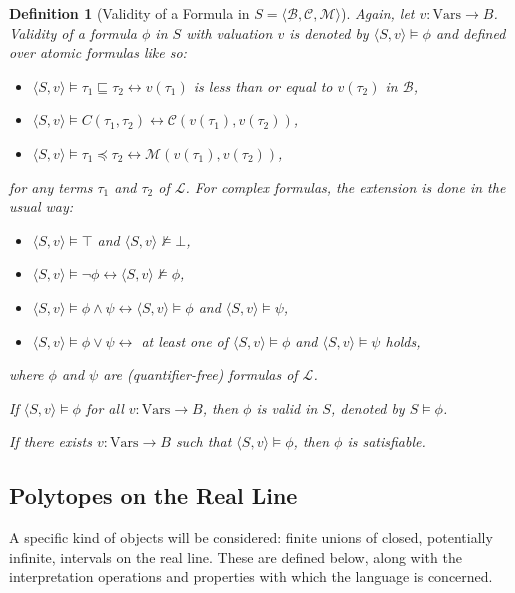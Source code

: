 \documentclass{article}
\newtheorem*{definition}{Definition}
\newcommand{\B}{\mathcal{B}}
\newcommand{\lang}{\mathcal{L}}
\newcommand{\Vars}{\text{Vars}}
\newcommand{\lpart}{\sqsubseteq}
\newcommand{\lcont}{C}
\newcommand{\lmeasure}{\preceq}
\begin{document}
\begin{definition}[Validity of a Formula in $S = \langle \B, \mathcal{C}, \mathcal{M} \rangle$]
  Again, let $v: \Vars \rightarrow B$. Validity of a formula $\phi$ in $S$ with valuation $v$ is denoted by $\langle S, v \rangle \models \phi$ and defined over atomic formulas like so:
  \begin{itemize}
  \item $\langle S, v \rangle \models \tau_1 \lpart \tau_2 \leftrightarrow v(\tau_1)$ is less than or equal to $v(\tau_2)$ in $\B$,
  \item $\langle S, v \rangle \models \lcont(\tau_1, \tau_2) \leftrightarrow \mathcal{C}(v(\tau_1), v(\tau_2))$,
  \item $\langle S, v \rangle \models \tau_1 \lmeasure \tau_2 \leftrightarrow \mathcal{M}(v(\tau_1), v(\tau_2))$,
  \end{itemize}
  for any terms $\tau_1$ and $\tau_2$ of $\lang$. For complex formulas, the extension is done in the usual way:
  \begin{itemize}
  \item $\langle S, v \rangle \models \top$ and $\langle S, v \rangle \not \models \bot$,
  \item $\langle S, v \rangle \models \lnot \phi \leftrightarrow \langle S, v \rangle \not\models \phi$,
  \item $\langle S, v \rangle \models \phi \land \psi \leftrightarrow \langle S, v \rangle \models \phi$ and $\langle S, v \rangle \models \psi$,
  \item $\langle S, v \rangle \models \phi \lor \psi \leftrightarrow$ at least one of  $\langle S, v \rangle \models \phi$ and $\langle S, v \rangle \models \psi$ holds,
  \end{itemize}
  where $\phi$ and $\psi$ are (quantifier-free) formulas of $\lang$.

  If $\langle S, v \rangle \models \phi$ for all $v: \Vars \rightarrow B$, then $\phi$ is valid in $S$, denoted by $S \models \phi$.

  If there exists $v: \Vars \rightarrow B$ such that $\langle S, v \rangle \models \phi$, then $\phi$ is satisfiable.
\end{definition}

\subsection{Polytopes on the Real Line}

A specific kind of objects will be considered: finite unions of closed, potentially infinite, intervals on the real line. These are defined below, along with the interpretation operations and properties with which the language is concerned.
\end{document}
